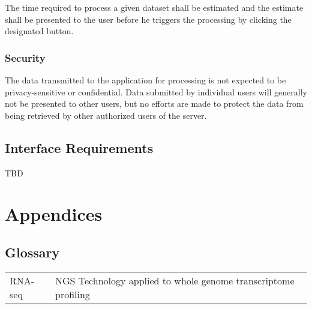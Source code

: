 \documentclass[a4paper]{srs}
\begin{document}
The time required to process a given dataset shall be estimated and the estimate 
shall be presented to the user before he triggers the processing by clicking the 
designated button.

\subsubsection{Security}
The data transmitted to the application for processing is not expected to 
be privacy-sensitive or confidential. Data submitted by individual users will 
generally not be presented to other users, but no efforts are made to protect 
the data from being retrieved by other authorized users of the server.

\subsection{Interface Requirements}

TBD

	\section{Appendices}

\subsection{Glossary}

\begin{tabularx}{\textwidth}{lX}
	  RNA-seq
	& NGS Technology applied to whole genome transcriptome profiling
\\
\end{tabularx}
\end{document}

